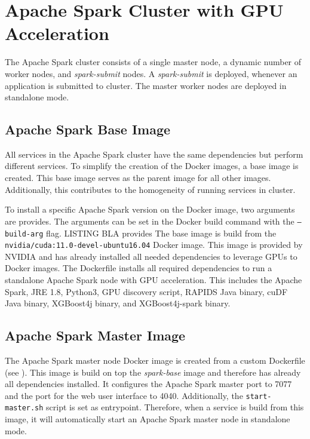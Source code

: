 \section{Apache Spark Cluster with GPU Acceleration}
The Apache Spark cluster consists of a single master node, a dynamic number of worker nodes, and \textit{spark-submit} nodes.
A \textit{spark-submit} is deployed, whenever an application is submitted to cluster.
The master worker nodes are deployed in standalone mode.


\subsection{Apache Spark Base Image}
All services in the Apache Spark cluster have the same dependencies but perform different services. To simplify the creation of the Docker images, a base image is created. This base image serves as the parent image for all other images.
Additionally, this contributes to the homogeneity of running services in cluster.


%
To install a specific Apache Spark version on the Docker image, two arguments are provides. The arguments can be set in the Docker build command with the \texttt{--build-arg} flag. LISTING BLA provides 
%
The base image is build from the \texttt{nvidia/cuda:11.0-devel-ubuntu16.04} Docker image. This image is provided by NVIDIA and has already installed all needed dependencies to leverage GPUs to Docker images.
%
The Dockerfile installs all required dependencies to run a standalone Apache Spark node with GPU acceleration. This includes the Apache Spark, JRE 1.8, Python3, GPU discovery script, RAPIDS Java binary, cuDF Java binary, XGBoost4j binary, and XGBoost4j-spark binary.


\subsection{Apache Spark Master Image}
The Apache Spark master node Docker image is created from a custom Dockerfile (see ).
This image is build on top the \textit{spark-base} image and therefore has already all dependencies installed.
It configures the Apache Spark master port to 7077 and the port for the web user interface to 4040.
Additionally, the \texttt{start-master.sh} script is set as entrypoint. Therefore, when a service is build from this image, it will automatically start an Apache Spark master node in standalone mode.


